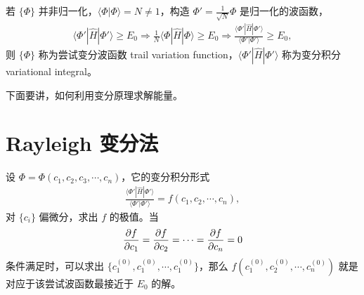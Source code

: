 若 $\{\Phi\}$ 并非归一化，$\langle\Phi|\Phi\rangle = N \neq 1$，构造 $\Phi' = \frac1{\sqrt N} \Phi$ 是归一化的波函数，
\begin{align}
    \langle \Phi' | \hat H | \Phi'  \rangle \geqslant E_0  \Rightarrow \frac1N \langle \Phi | \hat H | \Phi \rangle \geqslant E_0 \Rightarrow \frac{\langle \Phi' | \hat H | \Phi'  \rangle} {\langle \Phi' |  \Phi'  \rangle} \geqslant E_0,
\end{align}
则 $\{\Phi\}$ 称为尝试变分波函数 trail variation function，$\langle \Phi' | \hat H | \Phi'  \rangle$ 称为变分积分 variational integral。

下面要讲，如何利用变分原理求解能量。
\section{Rayleigh 变分法}

设 $\Phi=\Phi(c_1, c_2, c_3, \cdots, c_n)$，它的变分积分形式
\begin{align}
    \frac{\langle \Phi' | \hat H | \Phi'  \rangle} {\langle \Phi' |  \Phi'  \rangle} = f(c_1, c_2, \cdots, c_n),
\end{align}
对 $\{c_i\}$ 偏微分，求出 $f$ 的极值。当
\begin{align}
    \pdv{f}{c_1} = \pdv{f}{c_2} = \cdots = \pdv{f}{c_n} = 0
\end{align}
条件满足时，可以求出 $\{c_1^{(0)}, c_1^{(0)}, \cdots, c_1^{(0)}\}$，那么 $f(c_1^{(0)}, c_2^{(0)}, \cdots, c_n^{(0)})$ 就是对应于该尝试波函数最接近于 $E_0$ 的解。

